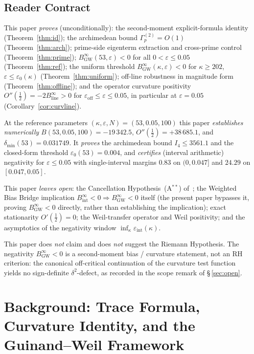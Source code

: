 \documentclass[11pt]{article}
\newcommand{\BinfGW}{B_{\mathrm{GW}}^{\infty}}   %
\newcommand{\Binfline}{B_{\mathrm{line}}^{\infty}} %
\newcommand{\dmin}{\delta_{\min}}           %
\newcommand{\Gp}{\Gamma_p^{(2)}}            %
\begin{document}
\subsection{Reader Contract}

This paper \emph{proves} (unconditionally):
the second-moment explicit-formula identity (Theorem~\ref{thm:id});
the archimedean bound $\Gp=O(1)$ (Theorem~\ref{thm:arch});
prime-side eigenterm extraction and cross-prime control
(Theorem~\ref{thm:prime});
$\BinfGW(53,\varepsilon)<0$ for all $0<\varepsilon\le 0.05$
(Theorem~\ref{thm:ref});
the uniform threshold $\BinfGW(\kappa,\varepsilon)<0$ for $\kappa\ge 202$,
$\varepsilon\le\varepsilon_0(\kappa)$ (Theorem~\ref{thm:uniform});
off-line robustness in magnitude form (Theorem~\ref{thm:offline});
and the operator curvature positivity $O''(\tfrac12)=-2\Binfline>0$ for
$\varepsilon_{\mathrm{off}}\le\varepsilon\le 0.05$, in particular at
$\varepsilon=0.05$ (Corollary~\ref{cor:curvline}).

At the reference parameters $(\kappa,\varepsilon,N)=(53,0.05,100)$ this paper
\emph{establishes numerically} $B(53,0.05,100)=-19\,342.5$,
$O''(\tfrac12)=+38\,685.1$, and $\dmin(53)=0.031749$.
It \emph{proves} the archimedean bound $I_4\le 3561.1$ and the closed-form
threshold $\varepsilon_0(53)=0.004$, and \emph{certifies} (interval
arithmetic) negativity for $\varepsilon\le 0.05$ with single-interval margins
$0.83$ on $(0,0.047]$ and $24.29$ on $[0.047,0.05]$.

This paper \emph{leaves open}:
the Cancellation Hypothesis~(A$^{**}$) of~\cite{Paper7};
the Weighted Bias Bridge implication
$B_{\mathrm{int}}^\infty<0\Rightarrow\BinfGW<0$ itself (the present paper
bypasses it, proving $\BinfGW<0$ directly, rather than establishing the
implication);
exact stationarity $O'(\tfrac12)=0$;
the Weil-transfer operator and Weil positivity;
and the asymptotics of the negativity window
$\inf_\kappa\varepsilon_{\mathrm{int}}(\kappa)$.

This paper does \emph{not} claim and does \emph{not} suggest the Riemann
Hypothesis.
The negativity $\BinfGW<0$ is a second-moment bias / curvature statement, not
an RH criterion: the canonical off-critical continuation of the curvature
test function yields no sign-definite $\delta^2$-defect, as recorded in the
scope remark of \S\,\ref{sec:open}.

\section{Background: Trace Formula, Curvature Identity, and the
Guinand--Weil Framework}
\label{sec:bg}
\end{document}
